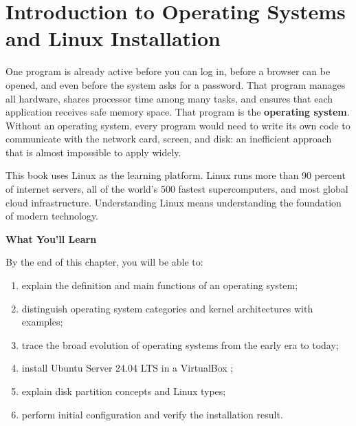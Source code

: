 
\chapter{Introduction to Operating Systems and Linux Installation}
\label{ch:introduction}


One program is already active before you can log in, before a browser can be opened, and even before the system asks for a password. That program manages all hardware, shares processor time among many tasks, and ensures that each application receives safe memory space. That program is the \textbf{operating system}. Without an operating system, every program would need to write its own code to communicate with the network card, screen, and disk: an inefficient approach that is almost impossible to apply widely.

This book uses Linux as the learning platform. Linux runs more than 90 percent of internet servers, all of the world's 500 fastest supercomputers, and most global cloud infrastructure. Understanding Linux means understanding the foundation of modern technology.

\textbf{What You'll Learn}

By the end of this chapter, you will be able to:

\begin{enumerate}
    \item explain the definition and main functions of an operating system;
    \item distinguish operating system categories and kernel architectures with examples;
    \item trace the broad evolution of operating systems from the early era to today;
    \item install Ubuntu Server 24.04 LTS in a VirtualBox ;
    \item explain disk partition concepts and Linux  types;
    \item perform initial configuration and verify the installation result.
\end{enumerate}

